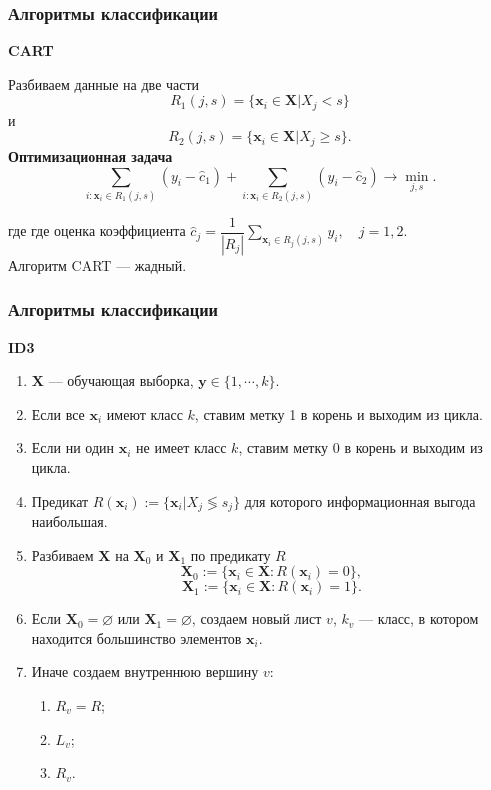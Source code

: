 \documentclass[pdf, 9pt, usenames, dvipsnames, unicode, hyperref={bookmarks=true,bookmarksopen=false, bookmarksnumbered}]{beamer}
\begin{document}
\begin{frame}\frametitle{Алгоритмы классификации}

\textbf{CART}

Разбиваем данные на две части
$$R_1(j,s) = \{ \textbf{x}_i \in \textbf{X} | X_j < s \}$$
и
$$R_2(j,s) = \{ \textbf{x}_i \in \textbf{X} | X_j \geq s \}.$$
\textbf{Оптимизационная задача}
$$\sum\limits_{i:\textbf{x}_i \in R_1 (j,s)} (y_i - \hat{c}_1) + \sum\limits_{i:\textbf{x}_i \in R_2 (j,s)} (y_i - \hat{c}_2) \to \min_{j,s}.$$

где где оценка коэффициента $\hat{c}_j = \dfrac{1}{|R_j|} \sum\limits_{\textbf{x}_i \in R_j(j,s)} y_i, \quad j = 1,2.$\\

Алгоритм CART --- жадный.

\end{frame}


\begin{frame}\frametitle{Алгоритмы классификации}

\textbf{ID3}

\begin{enumerate}
	\item $\textbf{X}$ --- обучающая выборка, $\textbf{y} \in \{1, \cdots, k\}$.
	\item Если все $\textbf{x}_i$ имеют класс $k$, ставим метку 1 в корень и выходим из цикла.
	\item Если ни один $\textbf{x}_i$ не имеет класс $k$, ставим метку 0 в корень и выходим из цикла.
	\item Предикат $R(\textbf{x}_i):=\{ \textbf{x}_i | X_j \lessgtr s_j \}$ для которого информационная выгода наибольшая.
	\item Разбиваем $\textbf{X}$ на $\textbf{X}_0$ и $\textbf{X}_1$ по предикату $R$
	$$\textbf{X}_0:=\{ \textbf{x}_i \in \textbf{X}:R(\textbf{x}_i) = 0 \},$$
	$$\textbf{X}_1:=\{ \textbf{x}_i \in \textbf{X}:R(\textbf{x}_i) = 1 \}.$$
	\item Если $\textbf{X}_0 = \varnothing$ или $\textbf{X}_1 = \varnothing$, создаем новый лист $v$, $k_v$ --- класс, в котором находится большинство элементов $\textbf{x}_i.$
	\item Иначе создаем внутреннюю вершину $v$:
		\begin{enumerate}
			\item $R_v = R$;
			\item $L_v$;
			\item $R_v$.
		\end{enumerate}
\end{enumerate}

\end{frame}
\end{document}
